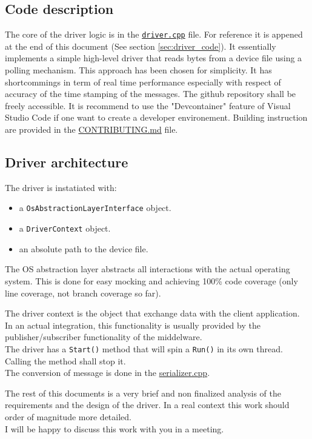 \subsection{Code description}
The core of the driver logic is in the \href{https://github.com/renn0xtek9/assignment/blob/master/flight_software/libs/embedded_software/uart_imu_driver/src/driver.cpp}{\texttt{driver.cpp}} file.
For reference it is appened at the end of this document (See section \ref{sec:driver_code}).
It essentially implements a simple high-level driver that reads bytes from a device file using a polling mechanism.
This approach has been chosen for simplicity.
It has shortcommings in term of real time performance especially with respect of accuracy of the time stamping of the messages.
The github repository shall be freely accessible. It is recommend to use the "Devcontainer" feature of Visual Studio Code if one want to create a developer environement.
Building instruction are provided in the \href{https://github.com/renn0xtek9/assignment/blob/master/CONTRIBUTING.md}{CONTRIBUTING.md} file.

\subsection{Driver architecture}
The driver is instatiated with:
\begin{itemize}
    \item a \texttt{OsAbstractionLayerInterface} object.
    \item a \texttt{DriverContext} object.
    \item an absolute path to the device file.
\end{itemize}

The OS abstraction layer abstracts all interactions with the actual operating system.
This is done for easy mocking and achieving 100\% code coverage (only line coverage, not branch coverage so far).

The driver context is the object that exchange data with the client application.
In an actual integration, this functionality is usually provided by the publisher/subscriber functionality of the middelware.\\
The driver has a \texttt{Start()} method that will spin a \texttt{Run()} in its own thread.
Calling the  method shall stop it.\\
The conversion of message is done in the \href{https://github.com/renn0xtek9/assignment/blob/master/flight_software/libs/embedded_software/serializer/src/serializer.cpp}{serializer.cpp}.

The rest of this documents is a very brief and non finalized analysis of the requirements and the design of the driver.
In a real context this work should order of magnitude more detailed.\\
I will be happy to discuss this work with you in a meeting.
